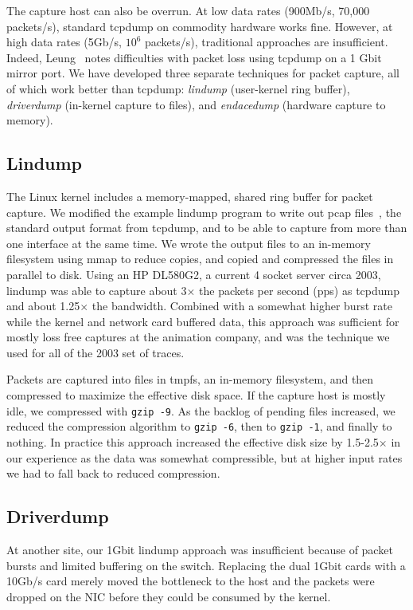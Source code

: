 The capture host can also be overrun. At low data rates (900Mb/s,
70,000 packets/s), standard tcpdump on commodity hardware works fine.
However, at high data rates (5Gb/s, $10^6$ packets/s),
traditional approaches are insufficient. Indeed,
Leung~\cite{LeungUsenix08} notes
difficulties with packet loss using tcpdump on a 1 Gbit mirror port.
We have developed three separate techniques for packet capture, all of
which work better than tcpdump: {\it lindump} (user-kernel ring
buffer), {\it driverdump} (in-kernel capture to files), and {\it
endacedump} (hardware capture to memory).  

\subsection{Lindump}

The Linux kernel includes a memory-mapped, shared ring buffer for
packet capture.  We modified the example lindump program to write out
pcap files~\cite{pcap}, the standard output format from tcpdump, and
to be able to capture from more than one interface at the same time.
We wrote the output files to an in-memory filesystem using mmap to
reduce copies, and copied and compressed the files in parallel to
disk.  Using an HP DL580G2, a current 4 socket server circa 2003,
lindump was able to capture about 3$\times$ the packets per second (pps) as
tcpdump and about 1.25$\times$ the bandwidth.  Combined with a somewhat
higher burst rate while the kernel and network card buffered data,
this approach was sufficient for mostly loss free captures at the animation
company, and was the technique we used for all of the 2003 set of
traces.

Packets are captured into files in tmpfs, an in-memory filesystem, and then compressed
to maximize the effective disk space.  If the capture host is mostly
idle, we compressed with {\tt gzip -9}. As the backlog of pending
files increased, we reduced the compression algorithm to {\tt gzip
-6}, then to {\tt gzip -1}, and finally to nothing.  In practice this
approach increased the effective disk size by 1.5-2.5$\times$ in our
experience as the data was somewhat compressible, but at higher input
rates we had to fall back to reduced compression.

\subsection{Driverdump}

At another site, our 1Gbit lindump approach was insufficient because
of packet bursts and limited buffering on the switch.  Replacing the
dual 1Gbit cards with a 10Gb/s card merely moved the bottleneck to the
host and the packets were dropped on the NIC before they could be
consumed by the kernel.

